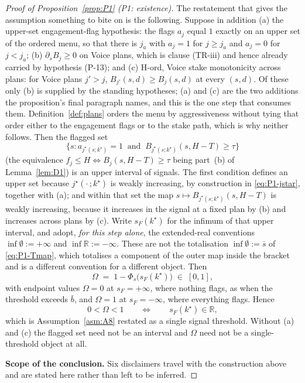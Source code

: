 \documentclass[11pt]{article}
\begin{document}
\begin{proof}[Proof of Proposition~\ref{prop:P1} (P1: existence)]
The restatement that gives the assumption something to bite on is the following. Suppose in addition
(a) the upper-set engagement-flag hypothesis: the flags $a_j$ equal $1$ exactly on an upper set of
the ordered menu, so that there is $j_a$ with $a_j = 1$ for $j \ge j_a$ and $a_j = 0$ for $j < j_a$;
(b) $\partial_s B_j \ge 0$ on Voice plans, which is clause (TR-iii) and hence already carried by
hypothesis (P-13); and (c) H-ord, Voice stake monotonicity across plans: for Voice plans $j' > j$,
$B_{j'}(s,d) \ge B_j(s,d)$ at every $(s,d)$. Of these only (b) is supplied by the standing
hypotheses; (a) and (c) are the two additions the proposition's final paragraph names, and this is
the one step that consumes them. Definition~\ref{def:plans} orders the menu by aggressiveness without
tying that order either to the engagement flags or to the stake path, which is why neither follows.
Then the flagged set
\[
\bigl\{s : a_{j^\star(s;k^\star)} = 1 \ \text{ and } \ B_{j^\star(s;k^\star)}(s,H-T) \ge \tau\bigr\}
\]
(the equivalence $f_j \le H \iff B_j(s,H-T) \ge \tau$ being part~(b) of Lemma~\ref{lem:D1}) is
an upper interval of signals. The first condition defines an upper set because
$j^\star(\cdot\,;k^\star)$ is weakly increasing, by construction in \eqref{eq:P1-jstar}, together with
(a); and within that set the map $s \mapsto B_{j^\star(s;k^\star)}(s,H-T)$ is weakly increasing,
because it increases in the signal at a fixed plan by (b) and increases across plans by (c). Write
$s_F(k^\star)$ for the infimum of that upper interval, and adopt, \emph{for this step alone}, the
extended-real conventions $\inf\emptyset := +\infty$ and $\inf\mathbb R := -\infty$. These are not
the totalisation $\inf\emptyset := \overline s$ of \eqref{eq:P1-Tmap}, which totalises a component of
the outer map inside the bracket and is a different convention for a different object. Then
\begin{equation}
\label{eq:P1-Omega}
\Omega \;=\; 1 - \Phi_s\bigl(s_F(k^\star)\bigr) \;\in\; [0,1],
\end{equation}
with endpoint values $\Omega = 0$ at $s_F = +\infty$, where nothing flags, as when the threshold
exceeds $\bar b$, and $\Omega = 1$ at $s_F = -\infty$, where everything flags. Hence
\[
0 < \Omega < 1
\qquad \Longleftrightarrow \qquad
s_F(k^\star) \in \mathbb R,
\]
which is Assumption~\ref{asm:A8} restated as a single signal threshold. Without (a) and (c) the
flagged set need not be an interval and $\Omega$ need not be a single-threshold object at all.

\medskip
\noindent\textbf{Scope of the conclusion.}
Six disclaimers travel with the construction above and are stated here rather than left to be
inferred.


\end{proof}
\end{document}
